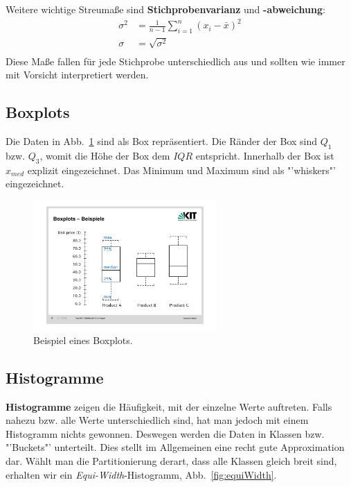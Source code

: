 Weitere wichtige Streumaße sind \textbf{Stichprobenvarianz} und
\textbf{-abweichung}:
\begin{align*}
	\sigma^{2} &= \frac{1}{n-1}\sum\limits_{i=1}^n (x_i -\bar{x})^2 \\
	\sigma &= \sqrt{\sigma^{2}} \\
\end{align*}
Diese Maße fallen für jede Stichprobe unterschiedlich aus und sollten wie immer
mit Vorsicht interpretiert werden.

\subsection{Boxplots}
\noindent Die Daten in Abb.~\ref{fig:boxplot} sind als Box repräsentiert. Die Ränder der Box sind \(Q_1\) bzw. \(Q_3\), womit die Höhe der Box dem \(IQR\) entspricht. Innerhalb der Box ist \(x_{med}\) explizit eingezeichnet. Das Minimum und Maximum sind als "'whiskers"' eingezeichnet.
\begin{figure}[ht]
	\centering
	\includegraphics[width=0.625\textwidth]{Figures/boxplot}
	\caption[Boxplot Beispiel]{Beispiel eines Boxplots.\footnotemark}
	\label{fig:boxplot}
\end{figure}

\subsection{Histogramme}
\textbf{Histogramme} zeigen die Häufigkeit, mit der einzelne Werte auftreten.
Falls nahezu bzw. alle Werte unterschiedlich sind, hat man jedoch mit einem
Histogramm nichts gewonnen. Deswegen werden die Daten in Klassen bzw.
"'Buckets"' unterteilt. Dies stellt im Allgemeinen eine recht gute
Approximation dar. Wählt man die Partitionierung derart, dass alle Klassen
gleich breit sind, erhalten wir ein \textit{Equi-Width}-Histogramm,
Abb.~\ref{fig:equiWidth}.

